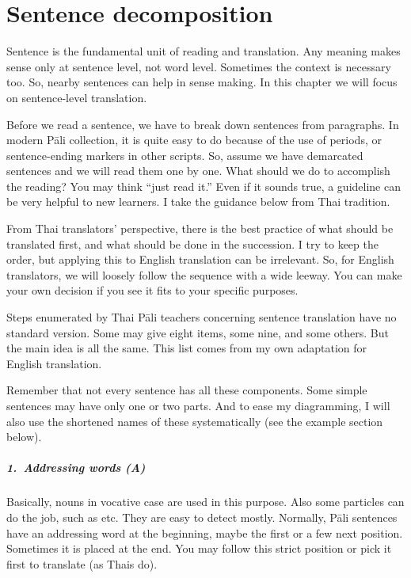 \chapter{Sentence decomposition}\label{chap:sentence}

Sentence is the fundamental unit of reading and translation. Any meaning makes sense only at sentence level, not word level. Sometimes the context is necessary too. So, nearby sentences can help in sense making. In this chapter we will focus on sentence-level translation.

Before we read a sentence, we have to break down sentences from paragraphs. In modern P\=ali collection, it is quite easy to do because of the use of periods, or sentence-ending markers in other scripts. So, assume we have demarcated sentences and we will read them one by one. What should we do to accomplish the reading? You may think ``just read it.'' Even if it sounds true, a guideline can be very helpful to new learners. I take the guidance below from Thai tradition.

From Thai translators' perspective, there is the best practice of what should be translated first, and what should be done in the succession. I try to keep the order, but applying this to English translation can be irrelevant. So, for English translators, we will loosely follow the sequence with a wide leeway. You can make your own decision if you see it fits to your specific purposes.

Steps enumerated by Thai P\=ali teachers concerning sentence translation have no standard version. Some may give eight items, some nine, and some others. But the main idea is all the same. This list comes from my own adaptation for English translation.

Remember that not every sentence has all these components. Some simple sentences may have only one or two parts. And to ease my diagramming, I will also use the shortened names of these systematically (see the example section below).

\paragraph*{1.\ Addressing words (\textbf{A})} Basically, nouns in vocative case are used in this purpose. Also some particles can do the job, such as  etc. They are easy to detect mostly. Normally, P\=ali sentences have an addressing word at the beginning, maybe the first or a few next position. Sometimes it is placed at the end. You may follow this strict position or pick it first to translate (as Thais do).

